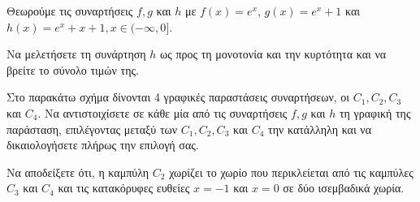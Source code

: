 Θεωρούμε τις συναρτήσεις $f, g$ και $h$ με $f(x) = e^x$, $g(x) = e^x + 1$ και $h(x) = e^x + x + 1, x \in (-\infty, 0]$.
\begin{alist}
\item Να μελετήσετε τη συνάρτηση $h$ ως προς τη μονοτονία και την κυρτότητα και να βρείτε το σύνολο τιμών της. 
\item Στο παρακάτω σχήμα δίνονται 4 γραφικές παραστάσεις συναρτήσεων, οι $C_1, C_2, C_3$ και $C_4$. Να αντιστοιχίσετε σε κάθε μία από τις συναρτήσεις $f, g$ και $h$ τη γραφική της παράσταση, επιλέγοντας μεταξύ των $C_1, C_2, C_3$ και $C_4$ την κατάλληλη και να δικαιολογήσετε πλήρως την επιλογή σας. 
\item Να αποδείξετε ότι, η καμπύλη $C_2$ χωρίζει το χωρίο που περικλείεται από τις καμπύλες $C_3$ και $C_4$ και τις κατακόρυφες ευθείες $x = -1$ και $x = 0$ σε δύο ισεμβαδικά χωρία. 
\end{alist}